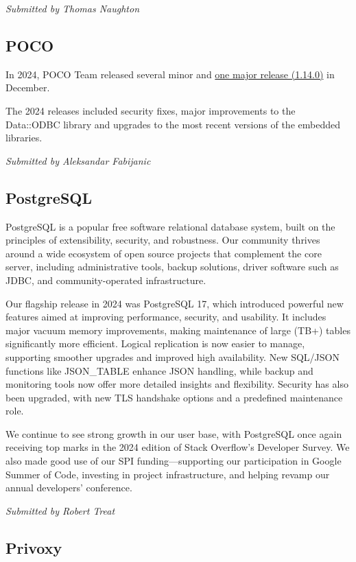 \documentclass[a4paper]{report}
\begin{document}
{\em Submitted by Thomas Naughton}

\subsection{POCO}

In 2024, POCO Team released several minor and \href{https://github.com/pocoproject/poco/releases/tag/poco-1.14.0-release}{one major release (1.14.0)} in December.

The 2024 releases included security fixes, major improvements to the Data::ODBC library and upgrades to the most recent versions of the embedded libraries.

{\em Submitted by Aleksandar Fabijanic}

\subsection{PostgreSQL}

PostgreSQL is a popular free software relational database system, built on the principles of extensibility, security, and robustness. Our community thrives around a wide ecosystem of open source projects that complement the core server, including administrative tools, backup solutions, driver software such as JDBC, and community-operated infrastructure.

Our flagship release in 2024 was PostgreSQL 17, which introduced powerful new features aimed at improving performance, security, and usability. It includes major vacuum memory improvements, making maintenance of large (TB+) tables significantly more efficient. Logical replication is now easier to manage, supporting smoother upgrades and improved high availability. New SQL/JSON functions like JSON\_TABLE enhance JSON handling, while backup and monitoring tools now offer more detailed insights and flexibility. Security has also been upgraded, with new TLS handshake options and a predefined maintenance role.

We continue to see strong growth in our user base, with PostgreSQL once again receiving top marks in the 2024 edition of Stack Overflow’s Developer Survey. We also made good use of our SPI funding—supporting our participation in Google Summer of Code, investing in project infrastructure, and helping revamp our annual developers’ conference.

{\em Submitted by Robert Treat}

\subsection{Privoxy}
\end{document}
